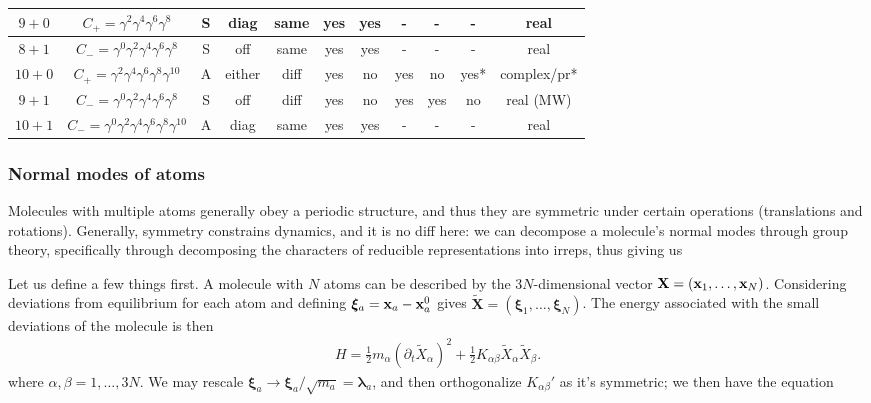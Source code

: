 \documentclass[11pt]{article}
\begin{document}
\begin{adjustwidth}{-2cm}{-2cm}
\begin{tabular}{|c|c|c|c|c|c|c|c|c|c|c|}
    $9{+}0$ &
    $C_+=\gamma^2\gamma^4\gamma^6\gamma^8$ &
    S & diag & same & yes & yes & - & - & - & real\\
    \hline
    $8{+}1$ &
    $C_-=\gamma^0\gamma^2\gamma^4\gamma^6\gamma^8$ &
    S & off & same & yes & yes & - & - & - & real\\
    \hline
    $10{+}0$ &
    $C_+=\gamma^2\gamma^4\gamma^6\gamma^8\gamma^{10}$ &
    A & either  & diff & yes & no & yes & no & yes* & complex/pr*\\
    \hline
    $9{+}1$ &
    $C_-=\gamma^0\gamma^2\gamma^4\gamma^6\gamma^8$ &
    S & off  & diff & yes & no & yes & yes & no & real (MW)\\
    \hline
    $10{+}1$ &
    $C_-=\gamma^0\gamma^2\gamma^4\gamma^6\gamma^8\gamma^{10}$ &
    A & diag & same & yes & yes & - & - & - & real\\
    \hline
    \end{tabular}
    
\end{adjustwidth}


\subsubsection{Normal modes of atoms}

Molecules with multiple atoms generally obey
a periodic structure, and thus they are symmetric
under certain operations (translations and rotations).
Generally, symmetry constrains dynamics, and it is no diff
here: we can decompose a molecule's normal modes through
group theory, specifically through decomposing the characters
of reducible representations into irreps, thus giving us 

Let us define a few things first. A molecule with $N$ atoms
can be described by the $3N$-dimensional vector $\mathbf{X} = (\mathbf{x}_1, \ldots, \mathbf{x}_N)$.
Considering deviations from equilibrium for each atom
and defining $\boldsymbol{\xi}_a = \mathbf{x}_a - \mathbf{x}_a^0$
gives $\widetilde{\mathbf{X}} = (\boldsymbol{\xi}_1, \ldots, \boldsymbol{\xi}_N)$.
The energy associated with the small deviations of the molecule is
then
\begin{align*}
    H = \frac{1}{2}m_\alpha (\partial_t \widetilde{X}_\alpha)^2 + \frac{1}{2}K_{\alpha \beta} \widetilde{X}_\alpha \widetilde{X}_\beta.
\end{align*}
where $\alpha, \beta = 1, \ldots, 3N$. We may rescale 
$\boldsymbol{\xi}_a \to \boldsymbol{\xi}_a/\sqrt{m_a} = \boldsymbol{\lambda}_a$,
and then orthogonalize $K_{\alpha \beta}'$ as it's symmetric;
we then have the equation 
\end{document}
